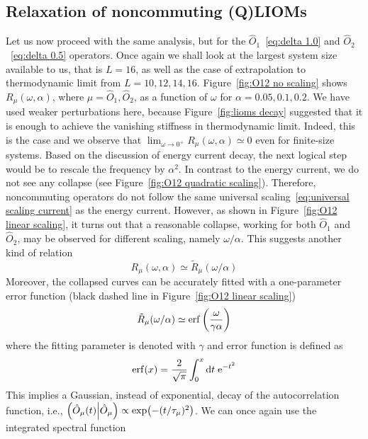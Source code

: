 \subsection{Relaxation of noncommuting (Q)LIOMs}
Let us now proceed with the same analysis, but for the \(\hat{O}_1\)~\eqref{eq:delta 1.0} 
and \(\hat{O}_2\)~\eqref{eq:delta 0.5} operators. Once again we shall look at the largest
system size available to us, that is \(L = 16\), as well as the case of extrapolation
to thermodynamic limit from \(L = 10,12,14,16\). 
Figure~\ref{fig:O12 no scaling} shows
\(R_{\mu}(\omega,\alpha)\), where \(\mu=\hat{O}_1,\hat{O}_2\), as a function of \(\omega\) for \(\alpha = 0.05,0.1,0.2\).
We have used weaker perturbations here, because Figure~\ref{fig:lioms decay} suggested that
it is enough to achieve the vanishing stiffness in thermodynamic limit. Indeed, this is the case
and we observe that \(\lim_{{\omega\to 0^{+}}} R_{\mu}(\omega,\alpha) \simeq 0\) even for finite-size systems.
Based on the discussion of energy current decay, the next logical step would be to rescale the
frequency by \(\alpha^2\).
In contrast to the energy current, we do not see any collapse (see Figure~\ref{fig:O12 quadratic scaling}).
Therefore, noncommuting operators do not follow the same universal scaling~\eqref{eq:universal scaling current}
as the energy current. However, as shown in Figure~\ref{fig:O12 linear scaling},
it turns out that a reasonable collapse, working for both \(\hat{O}_1\) and \(\hat{O}_2\),
may be observed for different scaling, namely \(\omega/\alpha\). This suggests another kind
of relation
\begin{equation}
  R_{\mu}(\omega,\alpha) \simeq \tilde{R}_{\mu}(\omega/\alpha)
\end{equation}
Moreover, the collapsed curves can be accurately fitted with a one-parameter error function
 (black dashed line in Figure~\ref{fig:O12 linear scaling})
\begin{equation}
  \tilde{R}_{\mu}(\omega/\alpha) \simeq \erf\left(\frac{\omega}{\gamma \alpha}\right)
  \label{eq:erf fit}
\end{equation}
where the fitting parameter is denoted with \(\gamma\) and error function is defined as
\begin{equation}
\erf(x) = \frac{2}{\sqrt{\pi}} \int_{0}^{x} \mathrm{d}t\; \mathrm{e}^{-t^2}  
\end{equation}
This implies a Gaussian, instead of
exponential, decay of the autocorrelation function, i.e., \(\left(\hat{O}_{\mu}(t) \middle| \hat{O}_{\mu}\right)
\propto \exp(-(t/\tau_{\mu})^2)\). We can once again use the integrated spectral function
